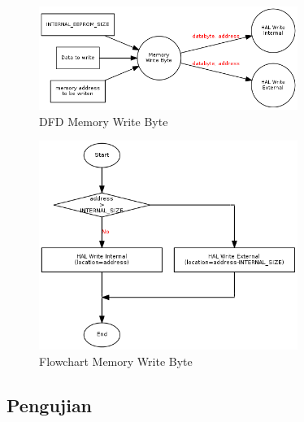 \begin{figure}[!h]
\centering
\includegraphics[width=0.75\textwidth]{image/memory/dfd_writebyte.png}
\caption{DFD Memory Write Byte}
\label{fig-dfd-writebyte}
\end{figure}

\begin{figure}[!h]
\centering
\includegraphics[width=0.75\textwidth]{image/memory/flow_writebyte.png}
\caption{Flowchart Memory Write Byte}
\label{fig-flow-writebyte}
\end{figure}

\subsection {Pengujian}


